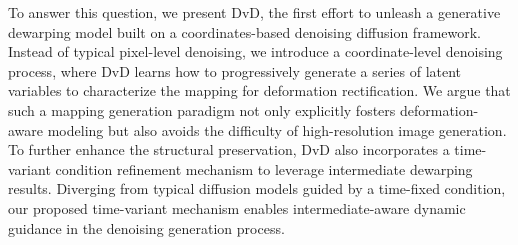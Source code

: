


To answer this question, we present DvD, the first effort to unleash a generative dewarping model built on a coordinates-based denoising diffusion framework. Instead of typical pixel-level denoising, we introduce a coordinate-level denoising process, where DvD learns how to progressively generate a series of latent variables to characterize the mapping for deformation rectification. We argue that such a mapping generation paradigm not only explicitly fosters deformation-aware modeling but also avoids the difficulty of high-resolution image generation. 
To further enhance the structural preservation, DvD also incorporates a time-variant condition refinement mechanism to leverage intermediate dewarping results. Diverging from typical diffusion models guided by a time-fixed condition, our proposed time-variant mechanism enables intermediate-aware dynamic guidance in the denoising generation process.

